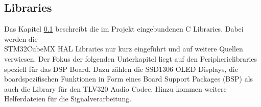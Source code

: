 \subsection{Libraries}
\label{sec:Libraries}

Das Kapitel \ref{sec:Libraries} beschreibt die im Projekt eingebundenen C Libraries.
Dabei werden die \\
STM32CubeMX HAL Libraries nur kurz eingeführt und auf weitere Quellen verwiesen.
Der Fokus der folgenden Unterkapitel liegt auf den Peripherielibraries speziell für das DSP Board. 
Dazu zählen die SSD1306 OLED Displays, die boardspezifischen Funktionen in Form eines Board Support Packages (BSP) als auch die Library für den TLV320 Audio Codec. Hinzu kommen weitere Helferdateien für die Signalverarbeitung.


